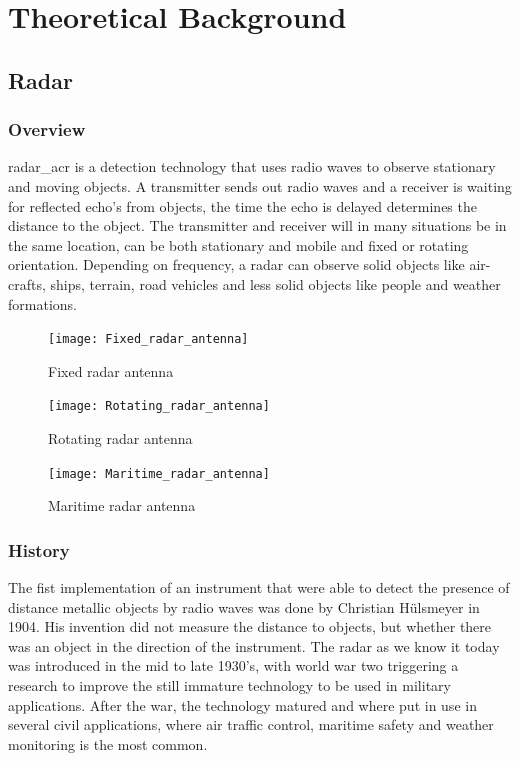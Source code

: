 
\chapter{Theoretical Background}\label{chapter:theoretical_background}
\section{Radar}
\subsection{Overview}
\gls{radar_acr} is a detection technology that uses radio waves to observe stationary and moving objects. A transmitter sends out radio waves and a receiver is waiting for reflected echo's from objects, the time the echo is delayed determines the distance to the object. The transmitter and receiver will in many situations be in the same location, can be both stationary and mobile and fixed or rotating orientation. Depending on frequency, a radar can observe solid objects like air-crafts, ships, terrain, road vehicles and less solid objects like people and weather formations.
\begin{figure}
\centering
\begin{minipage}{0.3\textwidth}
\texttt{[image: Fixed\_radar\_antenna]}
\caption{Fixed radar antenna}\label{fig:fixed_radar_antenna}
\end{minipage}\hfill
\begin{minipage}{0.3\textwidth}
\texttt{[image: Rotating\_radar\_antenna]}
\caption{Rotating radar antenna}\label{fig:rotating_radar_antenna}
\end{minipage}\hfill
\begin{minipage}{0.3\textwidth}
\texttt{[image: Maritime\_radar\_antenna]}
\caption{Maritime radar antenna}\label{fig:maritime_radar_antenna}
\end{minipage}
\end{figure}

\subsection{History}
The fist implementation of an instrument that were able to detect the presence of distance metallic objects by radio waves was done by Christian Hülsmeyer in 1904. His invention did not measure the distance to objects, but whether there was an object in the direction of the instrument. The radar as we know it today was introduced in the mid to late 1930's, with world war two triggering a research to improve the still immature technology to be used in military applications. After the war, the technology matured and where put in use in several civil applications, where air traffic control, maritime safety and weather monitoring is the most common.

